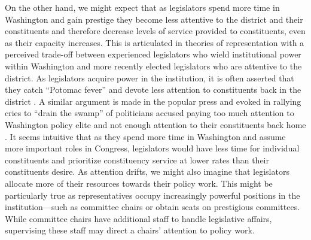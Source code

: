 \documentclass[12pt]{article}
\begin{document}
On the other hand, we might expect that as legislators spend more time in Washington and gain prestige they become less attentive to the district and their constituents and therefore decrease levels of service provided to constituents, even as their capacity increases. This is articulated in theories of representation with a perceived trade-off between experienced legislators who wield institutional power within Washington and more recently elected legislators who are attentive to the district.  As legislators acquire power in the institution, it is often asserted that they catch ``Potomac fever'' and devote less attention to constituents back in the district \citep{Fenno1978}.  A similar argument is made in the popular press \citep{Edwards2005} and evoked in rallying cries to ``drain the swamp'' of politicians accused paying too much attention to Washington policy elite and not enough attention to their constituents back home \citep{Rosenblatt2016}.  It seems intuitive that as they spend more time in Washington and assume more important roles in Congress, legislators would have less time for individual constituents and prioritize constituency service at lower rates than their constituents desire.  As attention drifts, we might also imagine that legislators allocate more of their resources towards their policy work.  This might be particularly true as representatives occupy increasingly powerful positions in the institution---such as committee chairs or obtain seats on prestigious committees. While committee chairs have additional staff to handle legislative affairs, supervising these staff may direct a chairs' attention to policy work. 



\end{document}

